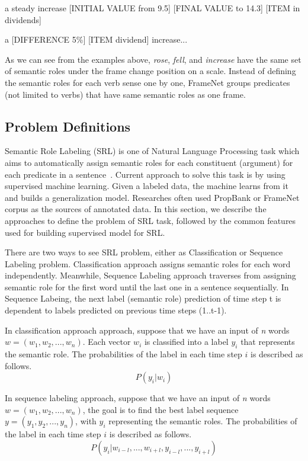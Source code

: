 a steady increase [INITIAL VALUE from 9.5] [FINAL VALUE to 14.3] [ITEM in dividends]

a [DIFFERENCE 5\%] [ITEM dividend] increase... 

As we can see from the examples above, \textit{rose}, \textit{fell}, and \textit{increase} have the same set of semantic roles under the frame change position on a scale. Instead of defining the semantic roles for each verb sense one by one, FrameNet groups predicates (not limited to verbs) that have same semantic roles as one frame.

\subsection{Problem Definitions}
Semantic Role Labeling (SRL) is one of Natural Language Processing task which aims to automatically assign semantic roles for each constituent (argument) for each predicate in a sentence~\citep{jurafsky2016speech}. Current approach to solve this task is by using supervised machine learning. Given a labeled data, the machine learns from it and builds a generalization model. Researches often used PropBank or FrameNet corpus as the sources of annotated data. In this section, we describe the approaches to define the problem of SRL task, followed by the common features used for building supervised model for SRL.

There are two ways to see SRL problem, either as Classification or Sequence Labeling problem. Classification approach assigns semantic roles for each word independently. Meanwhile, Sequence Labeling approach traverses from assigning semantic role for the first word until the last one in a sentence sequentially. In Sequence Labeing, the next label (semantic role) prediction of time step t is dependent to labels predicted on previous time steps (1..t-1).

In classification approach approach, suppose that we have an input of \textit{n} words $w = (w_{1}, w_{2}, ..., w_{n})$. Each vector $w_{i}$ is classified into a label $y_{i}$ that represents the semantic role. The probabilities of the label in each time step $i$ is described as follows.
\begin{equation}
P(y_{i}|w_{i})
\end{equation}

In sequence labeling approach, suppose that we have an input of \textit{n} words $w = (w_{1}, w_{2}, ..., w_{n})$, the goal is to find the best label sequence $y = (y_{1}, y_{2}, ..., y_{n})$, with $y_{i}$ representing the semantic roles. The probabilities of the label in each time step $i$ is described as follows.
\begin{equation}
P(y_{i}|w_{i-l}, ..., w_{i+l},y_{i-l}, ..., y_{i+l})
\end{equation}

